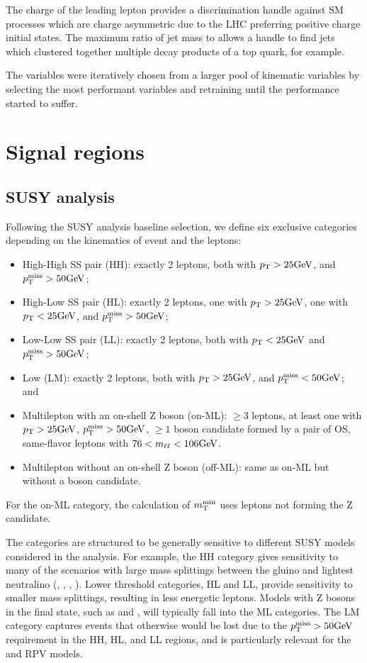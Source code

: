 The charge of the leading lepton provides a discrimination handle against SM processes which are
charge asymmetric due to the LHC preferring positive charge initial states.
The maximum ratio of jet mass to \pt allows a handle to find jets which clustered together 
multiple decay products of a top quark, for example.

The variables were iteratively chosen from a larger pool of kinematic variables by selecting
the most performant variables and retraining until the performance started to suffer.


\section{Signal regions}

\subsection{SUSY analysis}

Following the SUSY analysis baseline selection, we define 
six exclusive categories depending on the kinematics of event and the leptons:
\begin{itemize}
\item High-High SS pair (HH): exactly 2 leptons, both with $p_{\mathrm{T}}>25 \text{GeV}$, and $p_{\mathrm{T}}^\text{miss}>50 \text{GeV}$;
\item High-Low SS pair (HL): exactly 2 leptons, one with $p_{\mathrm{T}}>25 \text{GeV}$, one with $p_{\mathrm{T}}<25 \text{GeV}$, and $p_{\mathrm{T}}^\text{miss}>50 \text{GeV}$;
\item Low-Low SS pair (LL): exactly 2 leptons, both with $p_{\mathrm{T}}<25 \text{GeV}$ and $p_{\mathrm{T}}^\text{miss}>50 \text{GeV}$;
\item Low \ptmiss (LM): exactly 2 leptons, both with $p_{\mathrm{T}}>25 \text{GeV}$, and $p_{\mathrm{T}}^\text{miss}<50 \text{GeV}$; and
\item Multilepton with an on-shell Z boson (on-\PZ ML): $\geq$3 leptons, at least one with $p_{\mathrm{T}}>25 \text{GeV}$, $p_{\mathrm{T}}^\text{miss}>50 \text{GeV}$, $\geq 1$ \PZ boson candidate formed by a pair of OS, same-flavor leptons with $76 < m_{\ell\ell}< 106 \text{GeV}$.
\item Multilepton without an on-shell Z boson (off-\PZ ML): same as on-\PZ ML but without a \PZ boson candidate.
\end{itemize}

For the on-\PZ ML category, the calculation of $m_{\mathrm{T}}^{\text{min}}$ uses leptons not 
forming the Z candidate.

The categories are structured to be generally sensitive to different SUSY models
considered in the analysis. For example, the HH category gives sensitivity
to many of the scenarios with large mass splittings between the 
gluino and lightest neutralino (\Totttt, \TfttbbWW, \Tftttt, \TfqqqqWW).
Lower \pt threshold categories, HL and LL, provide sensitivity to smaller 
mass splittings, resulting in less energetic leptons. Models with
Z bosons in the final state, such as \TfqqqqWZ and \TsttHZ, will typically
fall into the ML categories. The LM category captures events that
otherwise would be lost due to the $p_{\mathrm{T}}^\text{miss}>50\text{GeV}$ requirement in the
HH, HL, and LL regions, and is particularly relevant for the 
\ToqqqqL and \Totbs RPV models.



